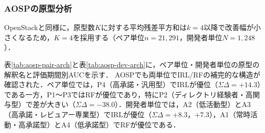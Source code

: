 \documentclass[submit]{ipsj}
\newcommand{\todo}[1]{\colorbox{yellow}{{\bf TODO}:}{\color{red} {\textbf{[#1]}}}}
\begin{document}









\subsubsection{AOSPの原型分析}\label{sec:aosp-arch}
OpenStackと同様に，原型数$K$に対する平均残差平方和は$k=4$以降で改善幅が小さくなるため，$K=4$を採用する（ペア単位$n=21{,}291$，開発者単位$N=1{,}248$）．

表\ref{tab:aosp-pair-arch}と表\ref{tab:aosp-dev-arch}に，ペア単位・開発者単位の原型の解釈名と評価期間別AUCを示す． AOSPでも両単位でIRL/RFの補完的な構造が確認された．ペア単位では，P4（高承諾・汎用型）でIRLが優位（$\Sigma\Delta=+14.3$）である一方，P1〜P3ではRFが優位であり，特にP2（ディレクトリ経験者・高関与型）で差が大きい（$\Sigma\Delta=-38.0$）．開発者単位では，A2（低活動型）とA3（高承諾・レビュアー専業型）でIRLが優位（$\Sigma\Delta=+8.3$，$+7.3$），A1（常時活動・高承諾型）とA4（低承諾型）でRFが優位である．
\end{document}
